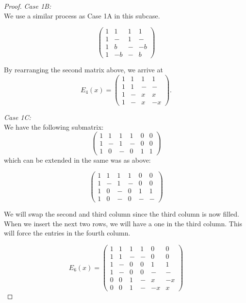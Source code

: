 \begin{lemma}
\begin{proof}
\emph{Case 1B:}\\
We use a similar process as Case 1A in this subcase.

 $$\left(\begin{array}{cccc}
     1 & 1 & 1 & 1 \\
     1 & - & 1 & - \\
     1 & b & - & -b \\
     1 & -b & - & b
    \end{array}\right)$$

By rearranging the second matrix above, we arrive at
$$E_4(x) =  \left(\begin{array}{cccc}
     1 & 1 & 1 & 1 \\
     1 & 1 & - & - \\
     1 & - & x & x \\
     1 & - & x & -x
    \end{array}\right).$$

\emph{Case 1C:}\\
We have the following submatrix:
 $$\left(\begin{array}{cccccc}
     1 & 1 & 1 & 1 & 0 & 0\\
     1 & - & 1 & - & 0 & 0\\
     1 & 0 & - & 0 & 1 & 1
    \end{array}\right)$$
\noindent which can be extended in the same was as above:

 $$\left(\begin{array}{cccccc}
     1 & 1 & 1 & 1 & 0 & 0\\
     1 & - & 1 & - & 0 & 0\\
     1 & 0 & - & 0 & 1 & 1 \\
     1 & 0 & - & 0 & - & -
    \end{array}\right)$$

We will swap the second and third column since the third column is now filled. When we insert the next two rows, we will have a one in the third column. This will force the entries in the fourth column.

 $$E_6(x)=\left(\begin{array}{cccccc}
     1 & 1 & 1 & 1 & 0 & 0 \\
     1 & 1 & - & - & 0 & 0 \\
     1 & - & 0 & 0 & 1 & 1 \\
     1 & - & 0 & 0 & - & - \\
     0 & 0 & 1 & - & x & -x \\
     0 & 0 & 1 & - & -x & x
    \end{array}\right)$$


\end{proof}
\end{lemma}
